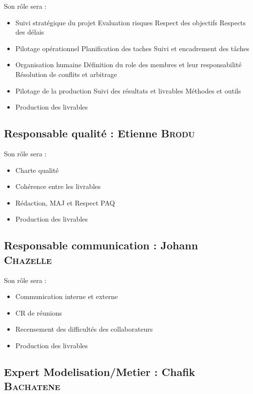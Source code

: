 Son rôle sera :
\begin{itemize}
    \item Suivi stratégique du projet
        \subitem Evaluation risques
        \subitem Respect des objectifs
        \subitem Respects des délais
    \item Pilotage opérationnel
        \subitem Planification des taches
        \subitem Suivi et encadrement des tâches
    \item Organisation humaine
        \subitem Définition du role des membres et leur responsabilité
        \subitem Résolution de conflits et arbitrage
    \item Pilotage de la production
        \subitem Suivi des résultats et livrables
        \subitem Méthodes et outils
    \item Production des livrables
\end{itemize}

\subsection{Responsable qualité : Etienne \textsc{Brodu}}

Son rôle sera :
\begin{itemize}
    \item Charte qualité
    \item Cohérence entre les livrables
    \item Rédaction, MAJ  et Respect PAQ
    \item Production des livrables
\end{itemize}

\subsection{Responsable communication : Johann \textsc{Chazelle}}

Son rôle sera :
\begin{itemize}
    \item Communication interne et externe
    \item CR de réunions
    \item Recensement des difficultés des collaborateurs
    \item Production des livrables
\end{itemize}

\subsection{Expert Modelisation/Metier : Chafik \textsc{Bachatene}}

